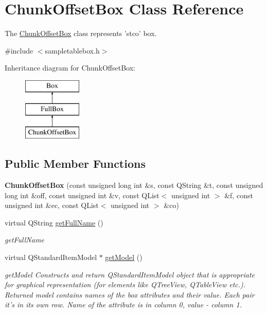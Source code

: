 \hypertarget{class_chunk_offset_box}{\section{Chunk\-Offset\-Box Class Reference}
\label{class_chunk_offset_box}
}


The \hyperlink{class_chunk_offset_box}{Chunk\-Offset\-Box} class represents 'stco' box.  




{\ttfamily \#include $<$sampletablebox.\-h$>$}

Inheritance diagram for Chunk\-Offset\-Box\-:\begin{figure}[H]
\begin{center}
\leavevmode
\includegraphics[height=3.000000cm]{class_chunk_offset_box}
\end{center}
\end{figure}
\subsection*{Public Member Functions}
\begin{DoxyCompactItemize}
\item 
\hypertarget{class_chunk_offset_box_a5a86166fb59bfa186c7a4094aacd4645}{{\bfseries Chunk\-Offset\-Box} (const unsigned long int \&s, const Q\-String \&t, const unsigned long int \&off, const unsigned int \&v, const Q\-List$<$ unsigned int $>$ \&f, const unsigned int \&ec, const Q\-List$<$ unsigned int $>$ \&co)}\label{class_chunk_offset_box_a5a86166fb59bfa186c7a4094aacd4645}

\item 
virtual Q\-String \hyperlink{class_chunk_offset_box_a1c26ce6ada45f85c65761ed27f382848}{get\-Full\-Name} ()
\begin{DoxyCompactList}\small\item\em get\-Full\-Name \end{DoxyCompactList}\item 
virtual Q\-Standard\-Item\-Model $\ast$ \hyperlink{class_chunk_offset_box_aa9dfe2b91c236fca8b311c34d1b0a053}{get\-Model} ()
\begin{DoxyCompactList}\small\item\em get\-Model Constructs and return Q\-Standard\-Item\-Model object that is appropriate for graphical representation (for elements like Q\-Tree\-View, Q\-Table\-View etc.). Returned model contains names of the box attributes and their value. Each pair it's in its own row. Name of the attribute is in column 0, value -\/ column 1. \end{DoxyCompactList}\end{DoxyCompactItemize}
